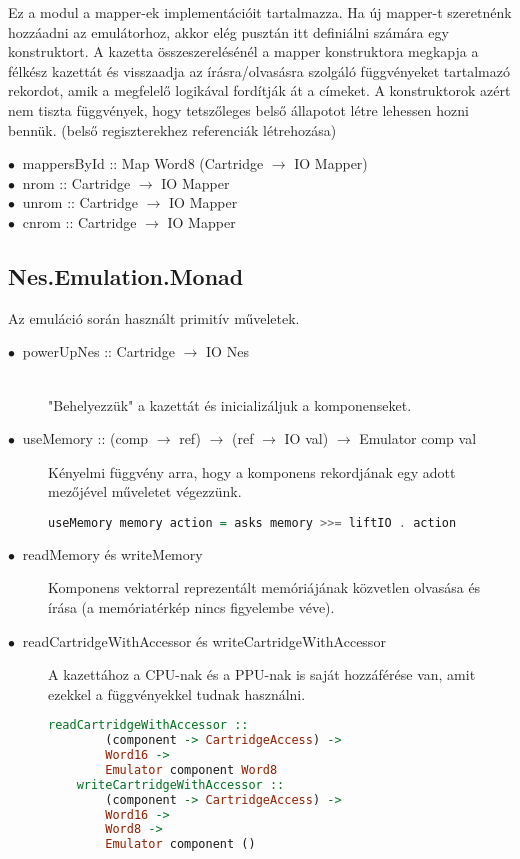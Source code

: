 Ez a modul a mapper-ek implementációit tartalmazza. Ha új mapper-t szeretnénk hozzáadni az emulátorhoz, akkor elég pusztán itt definiálni számára egy konstruktort. A kazetta összeszerelésénél a mapper konstruktora megkapja a félkész kazettát és visszaadja az írásra/olvasásra szolgáló függvényeket tartalmazó rekordot, amik a megfelelő logikával fordítják át a címeket.
A konstruktorok azért nem tiszta függvények, hogy tetszőleges belső állapotot létre lehessen hozni bennük. (belső regiszterekhez referenciák létrehozása)   

\begin{description}
	\item[$\bullet\:$ mappersById :: Map Word8 (Cartridge $\rightarrow$ IO Mapper)]
	\item[$\bullet\:$ nrom  :: Cartridge $\rightarrow$ IO Mapper]
	\item[$\bullet\:$ unrom :: Cartridge $\rightarrow$ IO Mapper]
	\item[$\bullet\:$ cnrom :: Cartridge $\rightarrow$ IO Mapper]
\end{description}

\subsection{Nes.Emulation.Monad}
Az emuláció során használt primitív műveletek.
\begin{description}
	\item[$\bullet\:$ powerUpNes :: Cartridge $\rightarrow$ IO Nes] \hfill \\
	"Behelyezzük" a kazettát és inicializáljuk a komponenseket.
	\item[$\bullet\:$ useMemory :: (comp $\rightarrow$ ref) $\rightarrow$ (ref $\rightarrow$ IO val) $\rightarrow$ Emulator comp val]
	Kényelmi függvény arra, hogy a komponens rekordjának egy adott mezőjével műveletet végezzünk.
	\begin{lstlisting}[language=Haskell]
	useMemory memory action = asks memory >>= liftIO . action
	\end{lstlisting}
	\item[$\bullet\:$ readMemory és writeMemory]
	Komponens vektorral reprezentált memóriájának közvetlen olvasása és írása (a memóriatérkép nincs figyelembe véve).
	\item[$\bullet\:$ readCartridgeWithAccessor és writeCartridgeWithAccessor]
	A kazettához a CPU-nak és a PPU-nak is saját hozzáférése van, amit ezekkel a függvényekkel tudnak használni.
	\begin{lstlisting}[language=Haskell]
	readCartridgeWithAccessor :: 
		(component -> CartridgeAccess) -> 
		Word16 -> 
		Emulator component Word8
	writeCartridgeWithAccessor ::
		(component -> CartridgeAccess) -> 
		Word16 ->
		Word8 -> 
		Emulator component ()
	\end{lstlisting}
\end{description}

